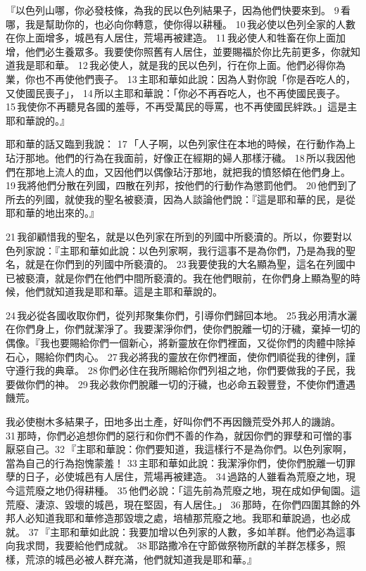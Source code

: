 『以色列山哪，你必發枝條，為我的民以色列結果子，因為他們快要來到。 9 看哪，我是幫助你的，也必向你轉意，使你得以耕種。 10 我必使以色列全家的人數在你上面增多，城邑有人居住，荒場再被建造。 11 我必使人和牲畜在你上面加增，他們必生養眾多。我要使你照舊有人居住，並要賜福於你比先前更多，你就知道我是耶和華。 12 我必使人，就是我的民以色列，行在你上面。他們必得你為業，你也不再使他們喪子。 13 主耶和華如此說：因為人對你說「你是吞吃人的，又使國民喪子」， 14 所以主耶和華說：「你必不再吞吃人，也不再使國民喪子。 15 我使你不再聽見各國的羞辱，不再受萬民的辱罵，也不再使國民絆跌。」這是主耶和華說的。』


耶和華的話又臨到我說： 17 「人子啊，以色列家住在本地的時候，在行動作為上玷汙那地。他們的行為在我面前，好像正在經期的婦人那樣汙穢。 18 所以我因他們在那地上流人的血，又因他們以偶像玷汙那地，就把我的憤怒傾在他們身上。 19 我將他們分散在列國，四散在列邦，按他們的行動作為懲罰他們。 20 他們到了所去的列國，就使我的聖名被褻瀆，因為人談論他們說：『這是耶和華的民，是從耶和華的地出來的。』 

21 我卻顧惜我的聖名，就是以色列家在所到的列國中所褻瀆的。所以，你要對以色列家說：『主耶和華如此說：以色列家啊，我行這事不是為你們，乃是為我的聖名，就是在你們到的列國中所褻瀆的。 23 我要使我的大名顯為聖，這名在列國中已被褻瀆，就是你們在他們中間所褻瀆的。我在他們眼前，在你們身上顯為聖的時候，他們就知道我是耶和華。這是主耶和華說的。

 24 我必從各國收取你們，從列邦聚集你們，引導你們歸回本地。 25 我必用清水灑在你們身上，你們就潔淨了。我要潔淨你們，使你們脫離一切的汙穢，棄掉一切的偶像。『我也要賜給你們一個新心，將新靈放在你們裡面，又從你們的肉體中除掉石心，賜給你們肉心。 27 我必將我的靈放在你們裡面，使你們順從我的律例，謹守遵行我的典章。 28 你們必住在我所賜給你們列祖之地，你們要做我的子民，我要做你們的神。 29 我必救你們脫離一切的汙穢，也必命五穀豐登，不使你們遭遇饑荒。 

我必使樹木多結果子，田地多出土產，好叫你們不再因饑荒受外邦人的譏誚。 31 那時，你們必追想你們的惡行和你們不善的作為，就因你們的罪孽和可憎的事厭惡自己。32 『主耶和華說：你們要知道，我這樣行不是為你們。以色列家啊，當為自己的行為抱愧蒙羞！ 33 主耶和華如此說：我潔淨你們，使你們脫離一切罪孽的日子，必使城邑有人居住，荒場再被建造。 34 過路的人雖看為荒廢之地，現今這荒廢之地仍得耕種。 35 他們必說：「這先前為荒廢之地，現在成如伊甸園。這荒廢、淒涼、毀壞的城邑，現在堅固，有人居住。」 36 那時，在你們四圍其餘的外邦人必知道我耶和華修造那毀壞之處，培植那荒廢之地。我耶和華說過，也必成就。
37 『主耶和華如此說：我要加增以色列家的人數，多如羊群。他們必為這事向我求問，我要給他們成就。 38 耶路撒冷在守節做祭物所獻的羊群怎樣多，照樣，荒涼的城邑必被人群充滿，他們就知道我是耶和華。』


